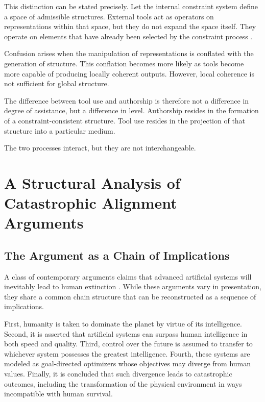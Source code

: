 \documentclass[11pt]{article}
\theoremstyle{plain}
\theoremstyle{definition}
\theoremstyle{remark}
\begin{document}
This distinction can be stated precisely. Let the internal constraint system
define a space of admissible structures. External tools act as operators
on representations within that space, but they do not expand the space
itself. They operate on elements that have already been selected by the
constraint process \cite{smolensky1986tensor}.

Confusion arises when the manipulation of representations is conflated
with the generation of structure. This conflation becomes more likely
as tools become more capable of producing locally coherent outputs.
However, local coherence is not sufficient for global structure.

The difference between tool use and authorship is therefore not a difference
in degree of assistance, but a difference in level. Authorship resides
in the formation of a constraint-consistent structure. Tool use resides
in the projection of that structure into a particular medium.

The two processes interact, but they are not interchangeable.

\section{A Structural Analysis of Catastrophic Alignment Arguments}

\subsection{The Argument as a Chain of Implications}

A class of contemporary arguments claims that advanced artificial systems
will inevitably lead to human extinction
\cite{yudkowsky2025if,bostrom2014superintelligence,russell2019human}.
While these arguments vary in presentation, they share a common chain
structure that can be reconstructed as a sequence of implications.

First, humanity is taken to dominate the planet by virtue of its
intelligence. Second, it is asserted that artificial systems can surpass
human intelligence in both speed and quality. Third, control over the
future is assumed to transfer to whichever system possesses the greatest
intelligence. Fourth, these systems are modeled as goal-directed optimizers
whose objectives may diverge from human values. Finally, it is concluded
that such divergence leads to catastrophic outcomes, including the
transformation of the physical environment in ways incompatible with
human survival.
\end{document}
